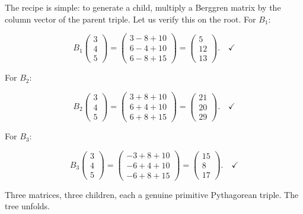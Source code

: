 \documentclass[11pt,openany]{book}
\theoremstyle{definition}
\theoremstyle{plain}
\theoremstyle{remark}
\begin{document}
The recipe is simple: to generate a child, multiply a Berggren matrix by the column vector of the parent triple. Let us verify this on the root. For $B_1$:

$$B_1 \begin{pmatrix} 3 \\ 4 \\ 5 \end{pmatrix} = \begin{pmatrix} 3 - 8 + 10 \\ 6 - 4 + 10 \\ 6 - 8 + 15 \end{pmatrix} = \begin{pmatrix} 5 \\ 12 \\ 13 \end{pmatrix}. \quad \checkmark$$

For $B_2$:

$$B_2 \begin{pmatrix} 3 \\ 4 \\ 5 \end{pmatrix} = \begin{pmatrix} 3 + 8 + 10 \\ 6 + 4 + 10 \\ 6 + 8 + 15 \end{pmatrix} = \begin{pmatrix} 21 \\ 20 \\ 29 \end{pmatrix}. \quad \checkmark$$

For $B_3$:

$$B_3 \begin{pmatrix} 3 \\ 4 \\ 5 \end{pmatrix} = \begin{pmatrix} -3 + 8 + 10 \\ -6 + 4 + 10 \\ -6 + 8 + 15 \end{pmatrix} = \begin{pmatrix} 15 \\ 8 \\ 17 \end{pmatrix}. \quad \checkmark$$

Three matrices, three children, each a genuine primitive Pythagorean triple. The tree unfolds.
\end{document}
